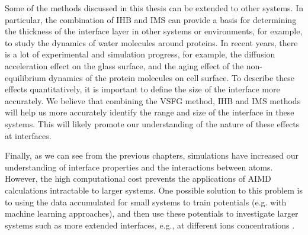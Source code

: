 
Some of the methods discussed in this thesis can be extended to other systems.
In particular, the combination of IHB and IMS can provide a basis for determining the thickness of the interface layer in other systems or environments, 
for example, to study the dynamics of water molecules around proteins. 
In recent years, there is a lot of experimental and simulation progress, for example, the diffusion acceleration effect on the glass surface\cite{ZhuL11,ZhangWei16}, 
and the aging effect of the non-equilibrium dynamics of the protein molecules on cell surface\cite{HuXiaohu16}. 
To describe these effects quantitatively, it is important to define the size of the interface more accurately. 
We believe that combining the VSFG method, IHB and IMS methods will help us more accurately identify the range and size of the interface in these systems.
This will likely promote our understanding of the nature of these effects at interfaces.

Finally, as we can see from the previous chapters, \abinitio simulations have increased our understanding of interface properties and the interactions between atoms.
However, the high computational cost prevents the applications of AIMD calculations intractable to larger systems.
One possible solution to this problem is to using the \abinitio data accumulated for small systems to train potentials (e.g. with machine learning approaches\cite{Norvig2010}), 
and then use these potentials to investigate larger systems such as more extended interfaces, e.g., at different ions concentrations 
\cite{Behler2007,Behler2011,Behler2014,Kolb2017}.



